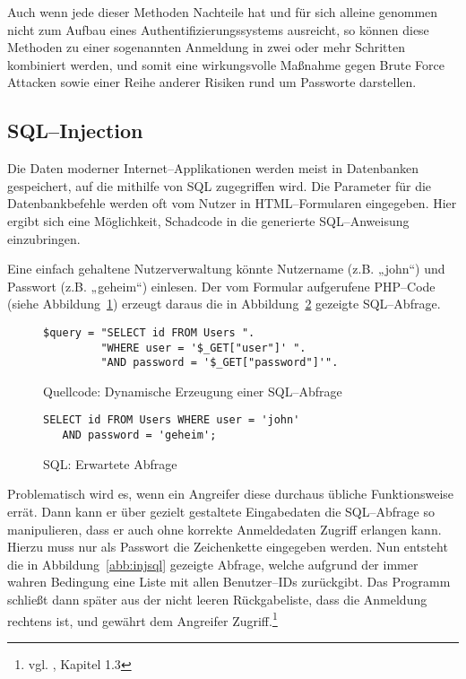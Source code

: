 Auch wenn jede dieser Methoden Nachteile hat und für sich alleine genommen nicht zum Aufbau eines Authentifizierungssystems ausreicht, so können diese Methoden zu einer sogenannten Anmeldung in zwei oder mehr Schritten kombiniert werden, und somit eine wirkungsvolle Maßnahme gegen Brute Force Attacken sowie einer Reihe anderer Risiken rund um Passworte darstellen.

\subsection{SQL--Injection}

Die Daten moderner Internet--Applikationen werden meist in Datenbanken gespeichert, auf die mithilfe von \ac{SQL} zugegriffen wird. Die Parameter für die Datenbankbefehle werden oft vom Nutzer in HTML--Formularen eingegeben. Hier ergibt sich eine Möglichkeit, Schadcode in die generierte SQL--Anweisung einzubringen.

Eine einfach gehaltene Nutzerverwaltung könnte Nutzername (z.B. „john“) und Passwort (z.B. „geheim“) einlesen. Der vom Formular aufgerufene PHP--Code (siehe Abbildung~\ref{abb:dysql}) erzeugt daraus die in Abbildung~\ref{abb:expsql} gezeigte SQL--Abfrage.

\begin{figure}[h]
\begin{verbatim}
$query = "SELECT id FROM Users ".
         "WHERE user = '$_GET["user"]' ".
         "AND password = '$_GET["password"]'".
\end{verbatim}
\caption{Quellcode: Dynamische Erzeugung einer SQL--Abfrage}
\label{abb:dysql}
\end{figure}

\begin{figure}[h]
\begin{verbatim}
SELECT id FROM Users WHERE user = 'john' 
   AND password = 'geheim';
\end{verbatim}
\caption{SQL: Erwartete Abfrage}
\label{abb:expsql}
\end{figure}

Problematisch wird es, wenn ein Angreifer diese durchaus übliche Funktionsweise errät. Dann kann er über gezielt gestaltete Eingabedaten die SQL--Abfrage so manipulieren, dass er auch ohne korrekte Anmeldedaten Zugriff erlangen kann. Hierzu muss nur als Passwort die Zeichenkette  eingegeben werden. Nun entsteht die in Abbildung~\ref{abb:injsql} gezeigte Abfrage, welche aufgrund der immer wahren Bedingung  eine Liste mit allen Benutzer--IDs zurückgibt. Das Programm schließt dann später aus der nicht leeren Rückgabeliste, dass die Anmeldung rechtens ist, und gewährt dem Angreifer Zugriff.\footnote{vgl. \cite{clarke}, Kapitel 1.3}

